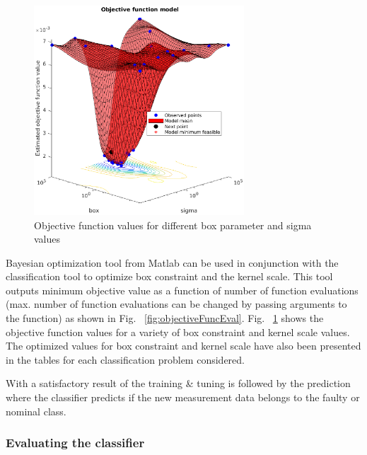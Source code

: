 \begin{figure}
\begin{center}
\includegraphics[width=0.7\textwidth]{figures/objFuncModel}    %
\caption{Objective function values for different box parameter and sigma values} 
\label{fig:objFuncModel}
\end{center}
\end{figure}


Bayesian optimization tool from Matlab can be used in conjunction with the classification tool to optimize box constraint and the kernel scale. This tool outputs minimum objective value as a function of number of function evaluations (max. number of function evaluations can be changed by passing arguments to the function) as shown in Fig. ~\ref{fig:objectiveFuncEval}. Fig. ~\ref{fig:objFuncModel} shows the objective function values for a variety of box constraint and kernel scale values. The optimized values for box constraint and kernel scale have also been presented in the tables for each classification problem considered.

With a satisfactory result of the training \& tuning is followed by the prediction where the classifier predicts if the new measurement data belongs to the faulty or nominal class. 

\subsubsection{Evaluating the classifier}
\label{evalClassifier}

